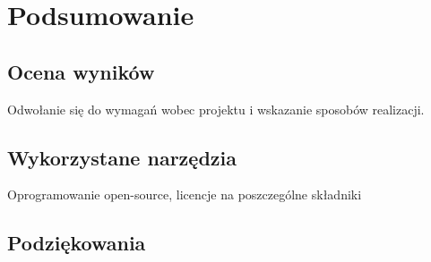 \newpage
\section{Podsumowanie}

\subsection{Ocena wyników}
\begin{todo}
    Odwołanie się do wymagań wobec projektu i wskazanie sposobów realizacji.
\end{todo}

\subsection{Wykorzystane narzędzia}
\begin{todo}
    Oprogramowanie open-source, licencje na poszczególne składniki
\end{todo}

\subsection{Podziękowania}